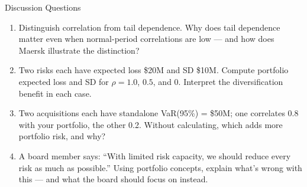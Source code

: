 \documentclass[11pt, aspectratio=169]{beamer}
\begin{document}
\begin{frame}{Discussion Questions}
\begin{enumerate}
  \item Distinguish correlation from tail dependence. Why does tail dependence matter even when normal-period correlations are low --- and how does Maersk illustrate the distinction?
  \item Two risks each have expected loss \$20M and SD \$10M. Compute portfolio expected loss and SD for $\rho = 1.0$, $0.5$, and $0$. Interpret the diversification benefit in each case.
  \item Two acquisitions each have standalone VaR(95\%) = \$50M; one correlates 0.8 with your portfolio, the other 0.2. Without calculating, which adds more portfolio risk, and why?
  \item A board member says: ``With limited risk capacity, we should reduce every risk as much as possible.'' Using portfolio concepts, explain what's wrong with this --- and what the board should focus on instead.
\end{enumerate}
\end{frame}
\end{document}
